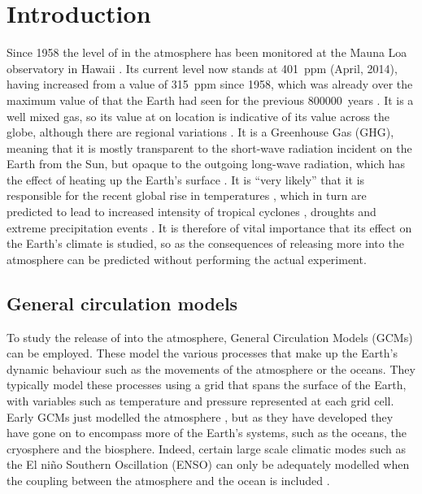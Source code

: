 \documentclass{article}
\begin{document}
\section{Introduction}

Since 1958 the level of  in the atmosphere has been monitored at the Mauna Loa observatory in Hawaii \parencite{keeling1976atmospheric}. Its current level now stands at \SI{401}{ppm} (April, 2014), having increased from a value of \SI{315}{ppm} since 1958, which was already over the maximum value of  that the Earth had seen for the previous \SI{800 000}{years} \parencite{yin2012individual}. It is a well mixed gas, so its value at on location is indicative of its value across the globe, although there are regional variations \parencite{gurney2002towards}. It is a Greenhouse Gas (GHG), meaning that it is mostly transparent to the short-wave radiation incident on the Earth from the Sun, but opaque to the outgoing long-wave radiation, which has the effect of heating up the Earth's surface \parencite{neelin2011climate}. It is ``very likely'' that it is responsible for the recent global rise in temperatures \parencite{ipcc2014wg1}, which in turn are predicted to lead to increased intensity of tropical cyclones \parencite{knutson2010tropical}, droughts \parencite{dai2012increasing} and extreme precipitation events \parencite{shongwe2009projected}. It is therefore of vital importance that its effect on the Earth's climate is studied, so as the consequences of releasing more  into the atmosphere can be predicted without performing the actual experiment.

\subsection{General circulation models}
To study the release of  into the atmosphere, General Circulation Models (GCMs) can be employed. These model the various processes that make up the Earth's dynamic behaviour such as the movements of the atmosphere or the oceans. They typically model these processes using a grid that spans the surface of the Earth, with variables such as temperature and pressure represented at each grid cell. Early GCMs just modelled the atmosphere \parencite{holloway1971simulation}, but as they have developed they have gone on to encompass more of the Earth's systems, such as the oceans, the cryosphere and the biosphere. Indeed, certain large scale climatic modes such as the El ni{\~n}o Southern Oscillation (ENSO) can only be adequately modelled when the coupling between the atmosphere and the ocean is included \parencite{neelin2011climate}. 
\end{document}
